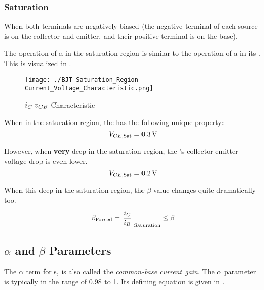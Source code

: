 \subsubsection{Saturation}\label{subsubsec:BJT_Saturation_Region}
When both terminals are negatively biased (the negative terminal of each source is on the collector and emitter, and their positive terminal is on the base).

\begin{remark*}
  The operation of a  in the saturation region is similar to the operation of a  in its .
  This is visualized in .
\end{remark*}

\begin{figure}[h!tbp]
  \centering
  \texttt{[image: ./BJT-Saturation\_Region-Current\_Voltage\_Characteristic.png]}
  \caption{$i_{C}$-$v_{CB}$ Characteristic \parencite[p.~317]{sedraTextbook7}}
  \label{fig:BJT-Saturation_Region-Current_Voltage_Characteristic}
\end{figure}

When in the saturation region, the  has the following unique property:
\begin{equation}\label{eq:BJT_Collector_Emitter_Saturation_Voltage}
  V_{CE, \mathrm{Sat}} = \SI{0.3}{\volt}
\end{equation}

However, when \textbf{very} deep in the saturation region, the 's collector-emitter voltage drop is even lower.
\begin{equation}\label{eq:BJT_Collector_Emitter_Deep_Saturation_Voltage}
  V_{CE, \mathrm{Sat}} = \SI{0.2}{\volt}
\end{equation}

When this deep in the saturation region, the $\beta$ value changes quite dramatically too.
\begin{equation}\label{eq:BJT-Beta_Forced}
  \beta_{\text{Forced}} = \left. \frac{i_{C}}{i_{B}} \right\rvert_{\text{Saturation}} \leq \beta
\end{equation}

\subsection{\texorpdfstring{$\alpha$ and $\beta$}{Alpha and Beta} Parameters}\label{subsec:BJT_Alpha_Beta_Parameters}
\begin{definition}\label{def:Common-Base_Current_Gain}\label{def:BJT-Alpha}
  The $\alpha$ term for s, is also called the \emph{common-base current gain}.
  The $\alpha$ parameter is typically in the range of 0.98 to 1.
  Its defining equation is given in .
\end{definition}

